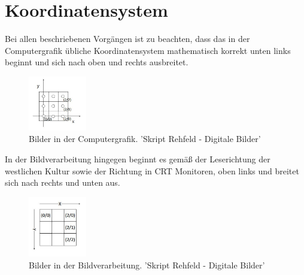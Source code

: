 \documentclass[tog]{acmsiggraph}
\begin{document}
\section{Koordinatensystem}
Bei allen beschriebenen Vorgängen ist zu beachten, dass das in der Computergrafik übliche Koordinatensystem mathematisch korrekt unten links beginnt und sich nach oben und rechts ausbreitet.

\begin{figure}[ht]
  \centering
  \includegraphics[width=1.0in]{images/koordinatenSystemComputergrafik}
  \caption{Bilder in der Computergrafik. 'Skript Rehfeld - Digitale Bilder'}
  \label{fig:Koordinatenursprung unten links}
\end{figure}

In der Bildverarbeitung hingegen beginnt es gemäß der Leserichtung der westlichen Kultur sowie der Richtung in CRT Monitoren, oben links und breitet sich nach rechts und unten aus.

\begin{figure}[ht]
  \centering
  \includegraphics[width=1.0in]{images/koordinatenSystemBildverarbeitung}
  \caption{Bilder in der Bildverarbeitung. 'Skript Rehfeld - Digitale Bilder'}
  \label{fig:Koordinatenursprung oben links}
\end{figure}



\nocite{*}

\end{document}

